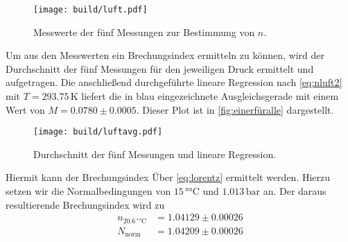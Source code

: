 \begin{figure}
    \centering
    \texttt{[image: build/luft.pdf]}
    \caption{Messwerte der fünf Messungen zur Bestimmung von $n$.}
    \label{fig:allefüreinen}
\end{figure}
Um aus den Messwerten ein Brechungsindex ermitteln zu können, wird der Durchschnitt der fünf Messungen für den jeweiligen Druck ermittelt und aufgetragen. Die anschließend durchgeführte lineare Regression nach \autoref{eq:nluft2} mit $T=293.75\,\unit{\kelvin}$
liefert die in blau eingezeichnete Ausgleichsgerade mit einem Wert von $M=0.0780\pm 0.0005$.
Dieser Plot ist in \autoref{fig:einerfüralle} dargestellt.
\begin{figure}
    \centering
    \texttt{[image: build/luftavg.pdf]}
    \caption{Durchschnitt der fünf Messungen und lineare Regression.}
    \label{fig:einerfüralle}
\end{figure}
Hiermit kann der Brechungsindex Über \autoref{eq:lorentz} ermittelt werden. Hierzu setzen wir die Normalbedingungen von $15\,°\unit{\celsius}$ und $1.013\,\unit{\bar}$ an.
Der daraus resultierende Brechungsindex wird zu
\begin{align*}
    n_{20.6\,°\unit{\celsius}}&=  1.04129\pm 0.00026   \\
    N_{\text{norm}}&=   1.04209\pm 0.00026      \\
\end{align*}
